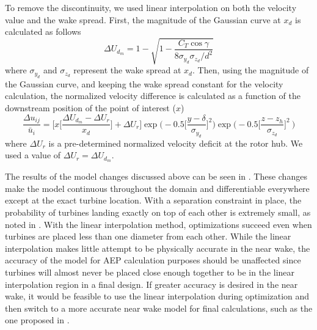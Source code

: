 \documentclass[conf]{new-aiaa}
\begin{document}
\vspace{5mm}

To remove the discontinuity, we used linear interpolation on both the velocity value and the wake spread. First, the magnitude of the Gaussian curve at $x_d$ is calculated as follows
%
\begin{equation}
	\Delta U_{d_m} = 1 - \sqrt{1 - \frac{C_T \cos{\gamma}}{8 \sigma_{y_d}  \sigma_{z_d}/d^2}}
\end{equation}
%
where $\sigma_{y_d}$ and $\sigma_{z_d}$ represent the wake spread at $x_d$. Then, using the magnitude of the Gaussian curve, and keeping the wake spread constant for the velocity calculation, the normalized velocity difference is calculated as a function of the downstream position of the point of interest ($x$)
\begin{equation}
	\frac{\Delta u_{ij}}{\bar{u}_{i}} = \bigg[x\bigg[\frac{\Delta U_{d_m} - \Delta U_r}{x_d}\bigg] + \Delta U_r\bigg]
        \exp{\bigg(-0.5\bigg[\frac{y-\delta}{ \sigma_{y_d}}\bigg]^2\bigg)}\exp{\bigg(-0.5\bigg[\frac{z-z_h}{ \sigma_{z_d}}\bigg]^2~\bigg)}
\end{equation}
%
where $\Delta U_r$ is a pre-determined normalized velocity deficit at the rotor hub. We used a value of $\Delta U_r=\Delta U_{d_m}$. 

The results of the model changes discussed above can be seen in . These changes make the model continuous throughout the domain and differentiable everywhere except at the exact turbine location. With a separation constraint in place, the probability of turbines landing exactly on top of each other is extremely small, as noted in \cite{thomas2017}. With the linear interpolation method, optimizations succeed even when turbines are placed less than one diameter from each other. While the linear interpolation makes little attempt to be physically accurate in the near wake, the accuracy of the model for AEP calculation purposes should be unaffected since turbines will almost never be placed close enough together to be in the linear interpolation region in a final design. If greater accuracy is desired in the near wake, it would be feasible to use the linear interpolation during optimization and then switch to a more accurate near wake model for final calculations, such as the one proposed in \cite{keane2016}.
\end{document}
